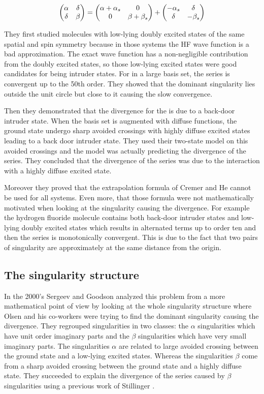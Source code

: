 \documentclass[11pt,a4paper]{article}
\begin{document}
\begin{equation}
\mqty(\alpha & \delta \\ \delta & \beta) = \mqty(\alpha + \alpha_s & 0 \\ 0 & \beta + \beta_s ) + \mqty(- \alpha_s & \delta \\ \delta & - \beta_s)
\end{equation}
 
They first studied molecules with low-lying doubly excited states of the same spatial and spin symmetry because in those systems the HF wave function is a bad approximation. The exact wave function has a non-negligible contribution from the doubly excited states, so those low-lying excited states were good candidates for being intruder states. For  in a large basis set, the series is convergent up to the 50th order. They showed that the dominant singularity lies outside the unit circle but close to it causing the slow convergence.

Then they demonstrated that the divergence for the  is due to a back-door intruder state. When the basis set is augmented with diffuse functions, the ground state undergo sharp avoided crossings with highly diffuse excited states leading to a back door intruder state. They used their two-state model on this avoided crossings and the model was actually predicting the divergence of the series. They concluded that the divergence of the series was due to the interaction with a highly diffuse excited state. 

Moreover they proved that the extrapolation formula of Cremer and He \cite{Cremer_1996} cannot be used for all systems. Even more, that those formula were not mathematically motivated when looking at the singularity causing the divergence. For example the hydrogen fluoride molecule contains both back-door intruder states and low-lying doubly excited states which results in alternated terms up to order ten and then the series is monotonically convergent. This is due to the fact that two pairs of singularity are approximately at the same distance from the origin.

\subsection{The singularity structure}

In the 2000's Sergeev and Goodson \cite{Sergeev_2005, Sergeev_2006}  analyzed this problem from a more mathematical point of view by looking at the whole singularity structure where Olsen and his co-workers were trying to find the dominant singularity causing the divergence. They regrouped singularities in two classes: the $\alpha$ singularities which have unit order imaginary parts and the $\beta$ singularities which have very small imaginary parts. The singularities $\alpha$ are related to large avoided crossing between the ground state and a low-lying excited states. Whereas the singularities $\beta$ come from a sharp avoided crossing between the ground state and a highly diffuse state. They succeeded to explain the divergence of the series caused by $\beta$ singularities using a previous work of Stillinger \cite{Stillinger_2000}. 
\end{document}
